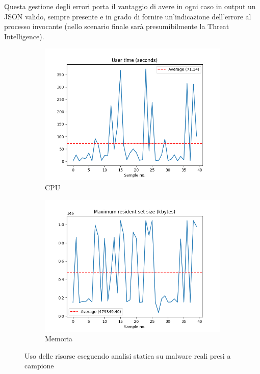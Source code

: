 Questa gestione degli errori porta il vantaggio di avere in ogni caso in output un JSON valido, sempre presente e in grado di fornire un'indicazione dell'errore al processo invocante (nello scenario finale sarà presumibilmente la Threat Intelligence).

\begin{figure}[htbp]
     \begin{subfigure}[b]{0.5\textwidth}
         \centering
         \includegraphics[width=\textwidth]{assets/static_analysis_exec_cpu_time.png}
         \caption{CPU}
         \label{fig:static_analysis_exec_cpu_time}
     \end{subfigure}
     \begin{subfigure}[b]{0.5\textwidth}
         \centering
         \includegraphics[width=\textwidth]{assets/static_analysis_exec_memory.png}
         \caption{Memoria}
         \label{fig:static_analysis_exec_memory}
     \end{subfigure}
     \caption{Uso delle risorse eseguendo analisi statica su malware reali presi a campione}
\end{figure}

